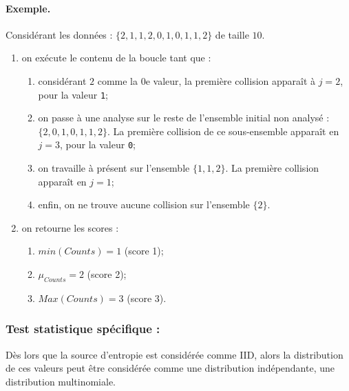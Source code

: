 \paragraph{Exemple.\\}
Considérant les données : $ \lbrace 2, 1, 1, 2, 0, 1, 0, 1, 1, 2 \rbrace$ de taille $10$.
\begin{enumerate}
\item on exécute le contenu de la boucle tant que : 
	\begin{enumerate}
	\item considérant $2$ comme la $0$e valeur, la première collision apparaît à $j=2$, pour la valeur \texttt{1};
	\item on passe à une analyse sur le reste de l'ensemble initial non analysé : $ \lbrace 2, 0, 1, 0, 1, 1, 2 \rbrace$. La première collision de ce sous-ensemble apparaît en $j=3$, pour la valeur \texttt{0};
	\item on travaille à présent sur l'ensemble $ \lbrace 1, 1, 2 \rbrace$. La première collision apparaît en $j=1$;
	\item enfin, on ne trouve aucune collision sur l'ensemble $\lbrace 2 \rbrace $.\\
	\end{enumerate}
\item on retourne les scores : 
	\begin{enumerate}
	\item $min(Counts) = 1$ (score 1);
	\item $\mu_{Counts} = 2$ (score 2);
	\item $Max(Counts) = 3$ (score 3).\\
	\end{enumerate}

\end{enumerate}

\subsubsection{Test statistique spécifique : \chidpdf}
Dès lors que la source d'entropie est considérée comme IID, alors la distribution de ces valeurs peut être considérée comme une distribution indépendante, une distribution multinomiale.

